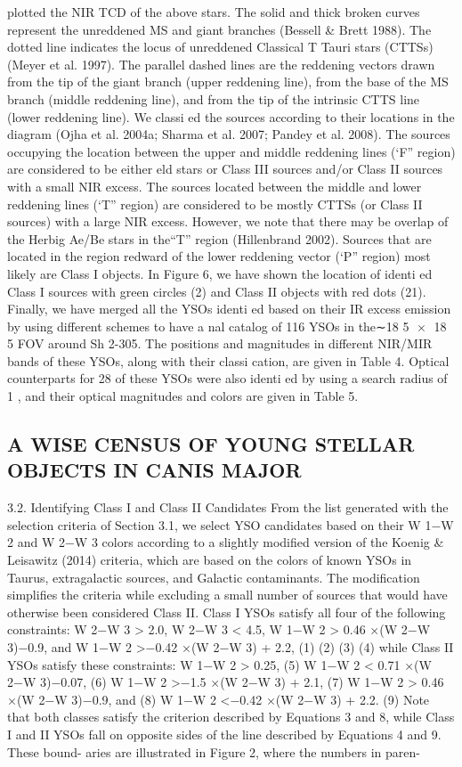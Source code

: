 \documentclass[../Main.tex]{subfiles}
\begin{document}
{plotted the NIR TCD of the above stars. The solid and
thick broken curves represent the unreddened MS and
giant branches (Bessell & Brett 1988). The dotted line
indicates the locus of unreddened Classical T Tauri stars
(CTTSs) (Meyer et al. 1997). The parallel dashed lines
are the reddening vectors drawn from the tip of the giant
branch (upper reddening line), from the base of the MS
branch (middle reddening line), and from the tip of the
intrinsic CTTS line (lower reddening line). We classi ed
the sources according to their locations in the diagram
(Ojha et al. 2004a; Sharma et al. 2007; Pandey et al.
2008). The sources occupying the location between the
upper and middle reddening lines (‘F” region) are
considered to be either eld stars or Class III sources
and/or Class II sources with a small NIR excess. The
sources located between the middle and lower reddening
lines (‘T” region) are considered to be mostly CTTSs (or
Class II sources) with a large NIR excess. However, we
note that there may be overlap of the Herbig Ae/Be stars
in the“T” region (Hillenbrand 2002). Sources that are
located in the region redward of the lower reddening
vector (‘P” region) most likely are Class I objects. In
Figure 6, we have shown the location of identi ed Class I
sources with green circles (2) and Class II objects with red
dots (21).
Finally, we have merged all the YSOs identi ed based on
their IR excess emission by using different schemes to have a
nal catalog of 116 YSOs in the∼18 5
×
18 5 FOV around
Sh 2-305. The positions and magnitudes in different NIR/MIR
bands of these YSOs, along with their classi cation, are given
in Table 4. Optical counterparts for 28 of these YSOs were also
identi ed by using a search radius of 1 , and their optical
magnitudes and colors are given in Table 5.

\subsection{A WISE CENSUS OF YOUNG STELLAR OBJECTS IN CANIS MAJOR}

3.2. Identifying Class I and Class II Candidates
From the list generated with the selection criteria of Section
3.1, we select YSO candidates based on their W 1−W 2 and
W 2−W 3 colors according to a slightly modified version of
the Koenig & Leisawitz (2014) criteria, which are based on
the colors of known YSOs in Taurus, extragalactic sources,
and Galactic contaminants. The modification simplifies the
criteria while excluding a small number of sources that would
have otherwise been considered Class II. Class I YSOs satisfy
all four of the following constraints:
W 2−W 3 > 2.0, W 2−W 3 < 4.5, W 1−W 2 > 0.46 ×(W 2−W 3)−0.9, and W 1−W 2 >−0.42 ×(W 2−W 3) + 2.2, (1)
(2)
(3)
(4)
while Class II YSOs satisfy these constraints:
W 1−W 2 > 0.25, (5)
W 1−W 2 < 0.71 ×(W 2−W 3)−0.07, (6)
W 1−W 2 >−1.5 ×(W 2−W 3) + 2.1, (7)
W 1−W 2 > 0.46 ×(W 2−W 3)−0.9, and (8)
W 1−W 2 <−0.42 ×(W 2−W 3) + 2.2. (9)
Note that both classes satisfy the criterion described by
Equations 3 and 8, while Class I and II YSOs fall on opposite
sides of the line described by Equations 4 and 9. These bound-
aries are illustrated in Figure 2, where the numbers in paren-

}
\end{document}
